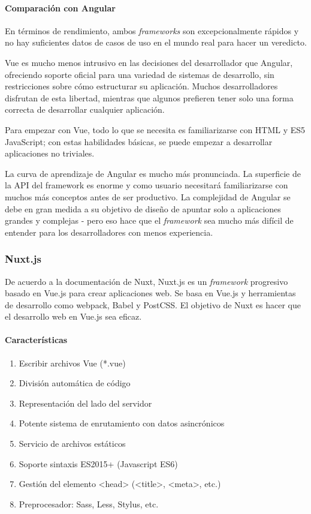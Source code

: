 \paragraph*{Comparación con Angular}
En términos de rendimiento, ambos \textit{frameworks} son excepcionalmente rápidos y no hay suficientes datos de casos de uso en el mundo real para hacer un veredicto.


Vue es mucho menos intrusivo en las decisiones del desarrollador que Angular, ofreciendo soporte oficial para una variedad de sistemas de desarrollo, sin restricciones sobre cómo estructurar su aplicación. Muchos desarrolladores disfrutan de esta libertad, mientras que algunos prefieren tener solo una forma correcta de desarrollar cualquier aplicación.


Para empezar con Vue, todo lo que se necesita es familiarizarse con HTML y ES5 JavaScript; con estas habilidades básicas, se puede empezar a desarrollar aplicaciones no triviales.


La curva de aprendizaje de Angular es mucho más pronunciada. La superficie de la API del framework es enorme y como usuario necesitará familiarizarse con muchos más conceptos antes de ser productivo. La complejidad de Angular se debe en gran medida a su objetivo de diseño de apuntar solo a aplicaciones grandes y complejas - pero eso hace que el \textit{framework} sea mucho más difícil de entender para los desarrolladores con menos experiencia.

\subsubsection*{Nuxt.js}
De acuerdo a la documentación de Nuxt\cite{noauthor_what_nodate-1}, Nuxt.js es un \textit{framework} progresivo basado en Vue.js para crear aplicaciones web. Se basa en Vue.js y herramientas de desarrollo como webpack, Babel y PostCSS. El objetivo de Nuxt es hacer que el desarrollo web en Vue.js sea eficaz.

\paragraph*{Características}
\begin{enumerate}
    \item Escribir archivos Vue (*.vue)
    \item División automática de código
    \item Representación del lado del servidor
    \item Potente sistema de enrutamiento con datos asincrónicos
    \item Servicio de archivos estáticos
    \item Soporte sintaxis ES2015+ (Javascript ES6)
    \item Gestión del elemento <head> (<title>, <meta>, etc.)
    \item Preprocesador: Sass, Less, Stylus, etc.
\end{enumerate}

